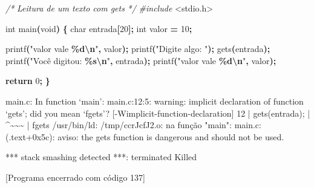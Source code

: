 \documentclass[
  11pt,
  a4paper,
]{scrbook}
\newenvironment{Shaded}{\begin{snugshade}}{\end{snugshade}}
\newcommand{\CommentTok}[1]{\textcolor[rgb]{0.56,0.35,0.01}{\textit{#1}}}
\newcommand{\ControlFlowTok}[1]{\textcolor[rgb]{0.13,0.29,0.53}{\textbf{#1}}}
\newcommand{\DataTypeTok}[1]{\textcolor[rgb]{0.13,0.29,0.53}{#1}}
\newcommand{\DecValTok}[1]{\textcolor[rgb]{0.00,0.00,0.81}{#1}}
\newcommand{\ImportTok}[1]{#1}
\newcommand{\NormalTok}[1]{#1}
\newcommand{\OperatorTok}[1]{\textcolor[rgb]{0.81,0.36,0.00}{\textbf{#1}}}
\newcommand{\PreprocessorTok}[1]{\textcolor[rgb]{0.56,0.35,0.01}{\textit{#1}}}
\newcommand{\SpecialCharTok}[1]{\textcolor[rgb]{0.81,0.36,0.00}{\textbf{#1}}}
\newcommand{\StringTok}[1]{\textcolor[rgb]{0.31,0.60,0.02}{#1}}
\begin{document}
\begin{Shaded}
\begin{Highlighting}[]
\CommentTok{/*}
\CommentTok{Leitura de um texto com gets}
\CommentTok{*/}
\PreprocessorTok{\#include }\ImportTok{\textless{}stdio.h\textgreater{}}

\DataTypeTok{int}\NormalTok{ main}\OperatorTok{(}\DataTypeTok{void}\OperatorTok{)} \OperatorTok{\{}
    \DataTypeTok{char}\NormalTok{ entrada}\OperatorTok{[}\DecValTok{20}\OperatorTok{];}
    \DataTypeTok{int}\NormalTok{ valor }\OperatorTok{=} \DecValTok{10}\OperatorTok{;}

\NormalTok{    printf}\OperatorTok{(}\StringTok{"\textquotesingle{}valor\textquotesingle{} vale }\SpecialCharTok{\%d\textbackslash{}n}\StringTok{"}\OperatorTok{,}\NormalTok{ valor}\OperatorTok{);}
\NormalTok{    printf}\OperatorTok{(}\StringTok{"Digite algo: "}\OperatorTok{);}
\NormalTok{    gets}\OperatorTok{(}\NormalTok{entrada}\OperatorTok{);}
\NormalTok{    printf}\OperatorTok{(}\StringTok{"Você digitou: \textquotesingle{}}\SpecialCharTok{\%s}\StringTok{\textquotesingle{}}\SpecialCharTok{\textbackslash{}n}\StringTok{"}\OperatorTok{,}\NormalTok{ entrada}\OperatorTok{);}
\NormalTok{    printf}\OperatorTok{(}\StringTok{"\textquotesingle{}valor\textquotesingle{} vale }\SpecialCharTok{\%d\textbackslash{}n}\StringTok{"}\OperatorTok{,}\NormalTok{ valor}\OperatorTok{);}

    \ControlFlowTok{return} \DecValTok{0}\OperatorTok{;}
\OperatorTok{\}}
\end{Highlighting}
\end{Shaded}

\begin{Shaded}
\begin{Highlighting}[]
\NormalTok{main.c: In function ‘main’:}
\NormalTok{main.c:12:5: warning: implicit declaration of function ‘gets’; did you }
\NormalTok{mean ‘fgets’? [{-}Wimplicit{-}function{-}declaration]}
\NormalTok{   12 |     gets(entrada);}
\NormalTok{      |     \^{}\textasciitilde{}\textasciitilde{}\textasciitilde{}}
\NormalTok{      |     fgets}
\NormalTok{/usr/bin/ld: /tmp/ccrJcfJ2.o: na função "main":}
\NormalTok{main.c:(.text+0x5c): aviso: the \textasciigrave{}gets\textquotesingle{} function is dangerous and should not }
\NormalTok{be used.}
\end{Highlighting}
\end{Shaded}

\begin{Shaded}
\begin{Highlighting}[]
\NormalTok{*** stack smashing detected ***: terminated}
\NormalTok{Killed}

\NormalTok{[Programa encerrado com código 137]}
\end{Highlighting}
\end{Shaded}
\end{document}
